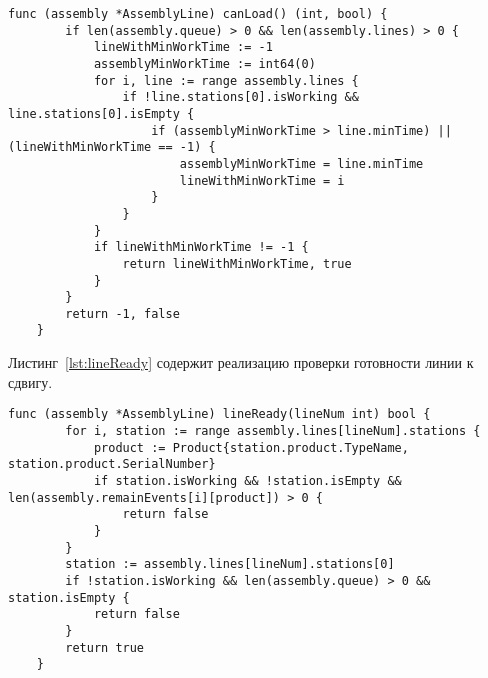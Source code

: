 \begin{lstlisting}[language=Golang,caption={Метод, определяющий возможность загрузки продукции на одну из линий},label=lst:lineCan]
	func (assembly *AssemblyLine) canLoad() (int, bool) {
		if len(assembly.queue) > 0 && len(assembly.lines) > 0 {
			lineWithMinWorkTime := -1
			assemblyMinWorkTime := int64(0)
			for i, line := range assembly.lines {
				if !line.stations[0].isWorking && line.stations[0].isEmpty {
					if (assemblyMinWorkTime > line.minTime) || (lineWithMinWorkTime == -1) {
						assemblyMinWorkTime = line.minTime
						lineWithMinWorkTime = i
					}
				}
			}
			if lineWithMinWorkTime != -1 {
				return lineWithMinWorkTime, true
			}
		}
		return -1, false
	}
\end{lstlisting}

Листинг~\ref{lst:lineReady} содержит реализацию проверки готовности линии к сдвигу.

\begin{lstlisting}[language=Golang,caption={Метод, производящий проверку готовности линии к сдвигу},label=lst:lineReady]
	func (assembly *AssemblyLine) lineReady(lineNum int) bool {
		for i, station := range assembly.lines[lineNum].stations {
			product := Product{station.product.TypeName, station.product.SerialNumber}
			if station.isWorking && !station.isEmpty && len(assembly.remainEvents[i][product]) > 0 {
				return false
			}
		}
		station := assembly.lines[lineNum].stations[0]
		if !station.isWorking && len(assembly.queue) > 0 && station.isEmpty {
			return false
		}
		return true
	}
\end{lstlisting}